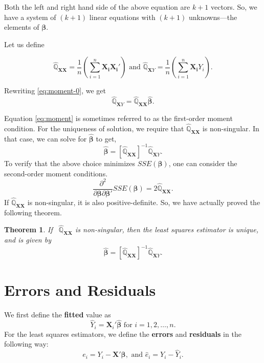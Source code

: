 \documentclass[
]{book}
\newtheorem{theorem}{Theorem}[chapter]
\theoremstyle{definition}
\theoremstyle{definition}
\theoremstyle{definition}
\theoremstyle{definition}
\theoremstyle{remark}
\begin{document}
Both the left and right hand side of the above equation are \(k+1\) vectors. So, we have a system of \((k+1)\) linear equations with \((k+1)\) unknowns---the elements of \(\pmb{\beta}\).

Let us define

\[
\widehat{\mathbb{Q}}_{\pmb{XX}}
=\frac{1}{n}\left(\sum\limits_{i=1}^n\pmb{X_i}\pmb{X_i}'\right)
\mbox{ and }
\widehat{\mathbb{Q}}_{\pmb{X}Y}
=\frac{1}{n}\left(\sum\limits_{i=1}^n\pmb{X_i}Y_i\right).
\]

Rewriting \eqref{eq:moment-0}, we get
\begin{equation}
\widehat{\mathbb{Q}}_{\pmb{X}Y}=\widehat{\mathbb{Q}}_{\pmb{XX}}
\widehat{\pmb{\beta}}.
\label{eq:moment}
\end{equation}

Equation \eqref{eq:moment} is sometimes referred to as the first-order moment condition. For the uniqueness of solution, we require that
\(\widehat{\mathbb{Q}}_{\pmb{XX}}\) is non-singular. In that case, we can solve for \(\widehat{\pmb{\beta}}\) to get,
\[
\widehat{\pmb{\beta}}=\left[\widehat{\mathbb{Q}}_{\pmb{XX}}\right]^{-1}
\widehat{\mathbb{Q}}_{\pmb{X}Y}.
\]
To verify that the above choice minimizes \(SSE(\pmb{\beta})\),
one can consider the second-order moment conditions.
\[
\frac{\partial^2}{\partial\pmb{\beta}\partial\pmb{\beta}'}SSE(\pmb{\beta})
=2\widehat{\mathbb{Q}}_{\pmb{XX}}.
\]
If \(\widehat{\mathbb{Q}}_{\pmb{XX}}\) is non-singular, it is also positive-definite. So, we have actually proved the following theorem.

\begin{theorem}
If ~\(\widehat{\mathbb{Q}}_{\pmb{XX}}\) is non-singular, then the
least squares estimator is unique, and is given by
\[
\widehat{\pmb{\beta}}=\left[\widehat{\mathbb{Q}}_{\pmb{XX}}\right]^{-1}
\widehat{\mathbb{Q}}_{\pmb{X}Y}.
\]
\end{theorem}

\hypertarget{errors-and-residuals}{%
\section{Errors and Residuals}\label{errors-and-residuals}}

We first define the \textbf{fitted} value as
\[
\widehat{Y}_i=\pmb{X}_i'\widehat{\pmb{\beta}}\mbox{ for }
i=1,2,\ldots,n.
\]
For the least squares estimators, we define the \textbf{errors} and \textbf{residuals} in the following way:
\[
e_i=Y_i-\pmb{X}'\pmb{\beta}, \mbox{ and } 
\widehat{e}_i=Y_i-\widehat{Y}_i.
\]
\end{document}
